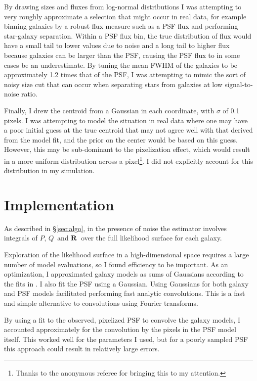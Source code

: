 \documentclass[usegraphicx,usenatbib]{mn2e}
\newcommand{\vecQ}{\mbox{\boldmath $Q$}}
\newcommand{\matR}{\mbox{$\bf R$}}
\begin{document}
By drawing sizes and fluxes from log-normal distributions I was attempting to
very roughly approximate a selection that might occur in real data, for example
binning galaxies by a robust flux measure such as a PSF flux and performing
star-galaxy separation.  Within a PSF flux bin, the true distribution of flux
would have a small tail to lower values due to noise and a long tail to higher
flux because galaxies can be larger than the PSF, causing the PSF flux to in
some cases be an underestimate.  By tuning the mean FWHM of the galaxies to be
approximately 1.2 times that of the PSF, I was attempting to mimic the sort of
noisy size cut that can occur when separating stars from galaxies at low
signal-to-noise ratio.

Finally, I drew the centroid from a Gaussian in each coordinate, with $\sigma$
of 0.1 pixels.  I was attempting to model the situation in real data where one
may have a poor initial guess at the true centroid that may not agree well with
that derived from the model fit, and the prior on the center would be based on
this guess.  However, this may be sub-dominant to the pixelization effect,
which would result in a more uniform distribution across a
pixel\footnote{Thanks to the anonymous referee for bringing this to my
attention.}.  I did not explicitly account for this distribution in my
simulation.

\section{Implementation} \label{sec:impl}

As described in \S \ref{sec:algo}, in the presence of noise the estimator
involves integrals of $P$, \vecQ\ and \matR\ over the full likelihood surface
for each galaxy.

Exploration of the likelihood surface in a high-dimensional space requires a
large number of model evaluations, so I found efficiency to be important.  As
an optimization, I approximated galaxy models as sums of Gaussians according to
the fits in \citet{HoggGMix}.  I also fit the PSF using a Gaussian.  Using
Gaussians for both galaxy and PSF models facilitated performing fast analytic
convolutions.  This is a fast and simple alternative to convolutions using
Fourier transforms.

By using a fit to the observed, pixelized PSF to convolve the galaxy models, I
accounted approximately for the convolution by the pixels in the PSF model
itself.  This worked well for the parameters I used, but for a poorly sampled
PSF this approach could result in relatively large errors.
\end{document}
